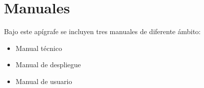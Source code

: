
\chapter{Manuales}

Bajo este apígrafe se incluyen tres manuales de diferente ámbito:

\begin{itemize}
  \item Manual técnico
  \item Manual de despliegue
  \item Manual de usuario
\end{itemize}







